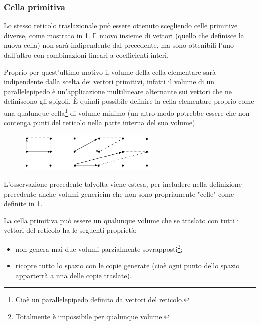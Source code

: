 \subsubsection{Cella primitiva}

Lo stesso reticolo traslazionale può essere ottenuto scegliendo celle primitive diverse, come mostrato in \cref{fig:elcell}. Il nuovo insieme di vettori (quello che definisce la nuova cella) non sarà indipendente dal precedente, ma sono ottenibili l'uno dall'altro con combinazioni lineari a coefficienti interi.

Proprio per quest'ultimo motivo il volume della cella elementare sarà indipendente dalla scelta dei vettori primitivi, infatti il volume di un parallelepipedo è un'applicazione multilineare alternante sui vettori che ne definiscono gli spigoli.
\`E quindi possibile definire la cella elementare proprio come una qualunque cella\footnote{\label{note:cell} Cioè un parallelepipedo definito da vettori del reticolo.} di volume minimo (un altro modo potrebbe essere che non contenga punti del reticolo nella parte interna del suo volume).

\begin{figure}[h]
	\centering
	\includegraphics[width=0.6\textwidth]{Immagini/ElementaryCell.png}
	\vspace{-5pt}
	\caption{}
	\label{fig:elcell}
	\vspace{-5pt}
\end{figure}

L'osservazione precedente talvolta viene estesa, per includere nella definizione precedente anche volumi genericim che non sono propriamente "celle" come definite in \cref{note:cell}.

\begin{defn}
	La cella primitiva può essere un qualunque volume che se traslato con tutti i vettori del reticolo ha le seguenti proprietà:
	\begin{itemize}
		\item non genera mai due volumi parzialmente sovrapposti\footnote{Totalmente è impossibile per qualunque volume.};
		\item ricopre tutto lo spazio con le copie generate (cioè ogni punto dello spazio apparterrà a una delle copie traslate).
	\end{itemize}
\end{defn}

